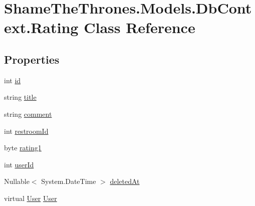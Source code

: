 \hypertarget{class_shame_the_thrones_1_1_models_1_1_db_context_1_1_rating}{}\section{Shame\+The\+Thrones.\+Models.\+Db\+Context.\+Rating Class Reference}
\label{class_shame_the_thrones_1_1_models_1_1_db_context_1_1_rating}
\subsection*{Properties}
\begin{DoxyCompactItemize}
\item 
int \hyperlink{class_shame_the_thrones_1_1_models_1_1_db_context_1_1_rating_aa243b6fe3439eb1446e0dd5c347eeb62}{id}
\item 
string \hyperlink{class_shame_the_thrones_1_1_models_1_1_db_context_1_1_rating_ae17ce6c1a165e61b2f21d54cfeecab36}{title}
\item 
string \hyperlink{class_shame_the_thrones_1_1_models_1_1_db_context_1_1_rating_a2ea2cd8a03f5497b47fa7d89bd8a1d2c}{comment}
\item 
int \hyperlink{class_shame_the_thrones_1_1_models_1_1_db_context_1_1_rating_a4930151ff6e1755c3d53834ad16e72b0}{restroom\+Id}
\item 
byte \hyperlink{class_shame_the_thrones_1_1_models_1_1_db_context_1_1_rating_a24a123c4fa0ec074113edb0db72ec14e}{rating1}
\item 
int \hyperlink{class_shame_the_thrones_1_1_models_1_1_db_context_1_1_rating_a714d494d3b10f60305827e75c1e2fdc4}{user\+Id}
\item 
Nullable$<$ System.\+Date\+Time $>$ \hyperlink{class_shame_the_thrones_1_1_models_1_1_db_context_1_1_rating_af9e83cb0cf69c37d6817ca7a6468dd8b}{deleted\+At}
\item 
virtual \hyperlink{class_shame_the_thrones_1_1_models_1_1_db_context_1_1_user}{User} \hyperlink{class_shame_the_thrones_1_1_models_1_1_db_context_1_1_rating_a40758cf02663adb65bcb097bc34b5e58}{User}
\end{DoxyCompactItemize}



